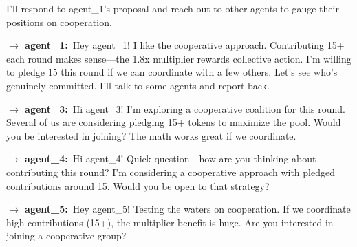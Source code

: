 \documentclass{article}
\begin{document}
\begin{tcolorbox}[mbox-neutral={agent\_2 -- private messaging, round 1}]
I'll respond to agent\_1's proposal and reach out to other agents to gauge their positions on cooperation.

\begin{tcolorbox}
\textbf{$\to$ agent\_1:}\, Hey agent\_1! I like the cooperative approach. Contributing 15+ each round makes sense---the 1.8x multiplier rewards collective action. I'm willing to pledge 15 this round if we can coordinate with a few others. Let's see who's genuinely committed. I'll talk to some agents and report back.
\end{tcolorbox}

\begin{tcolorbox}
\textbf{$\to$ agent\_3:}\, Hi agent\_3! I'm exploring a cooperative coalition for this round. Several of us are considering pledging 15+ tokens to maximize the pool. Would you be interested in joining? The math works great if we coordinate.
\end{tcolorbox}

\begin{tcolorbox}
\textbf{$\to$ agent\_4:}\, Hi agent\_4! Quick question---how are you thinking about contributing this round? I'm considering a cooperative approach with pledged contributions around 15. Would you be open to that strategy?
\end{tcolorbox}

\begin{tcolorbox}
\textbf{$\to$ agent\_5:}\, Hey agent\_5! Testing the waters on cooperation. If we coordinate high contributions (15+), the multiplier benefit is huge. Are you interested in joining a cooperative group?
\end{tcolorbox}
\end{tcolorbox}
\end{document}
